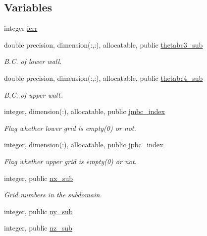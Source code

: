 \subsection*{Variables}
\begin{DoxyCompactItemize}
\item 
integer \hyperlink{namespacempi__subdomain_acd16f258caed20a7d8d38cd28ae64688}{ierr}
\item 
double precision, dimension(\+:,\+:), allocatable, public \hyperlink{namespacempi__subdomain_ad61f27caf5f32301a077e21363c2d73b}{thetabc3\+\_\+sub}
\begin{DoxyCompactList}\small\item\em B.\+C. of lower wall. \end{DoxyCompactList}\item 
double precision, dimension(\+:,\+:), allocatable, public \hyperlink{namespacempi__subdomain_ad1705bede0c0d39ad16f9f94afe32be6}{thetabc4\+\_\+sub}
\begin{DoxyCompactList}\small\item\em B.\+C. of upper wall. \end{DoxyCompactList}\item 
integer, dimension(\+:), allocatable, public \hyperlink{namespacempi__subdomain_ac22380b1c941dd6c53cabe7287d185e9}{jmbc\+\_\+index}
\begin{DoxyCompactList}\small\item\em Flag whether lower grid is empty(0) or not. \end{DoxyCompactList}\item 
integer, dimension(\+:), allocatable, public \hyperlink{namespacempi__subdomain_a9adbfdd11c7e9fdb968bb8eef2b13c2b}{jpbc\+\_\+index}
\begin{DoxyCompactList}\small\item\em Flag whether upper grid is empty(0) or not. \end{DoxyCompactList}\end{DoxyCompactItemize}
\textbf{ }\par
\begin{DoxyCompactItemize}
\item 
integer, public \hyperlink{namespacempi__subdomain_a005fe127fe0fc85b932814a820a36444}{nx\+\_\+sub}
\begin{DoxyCompactList}\small\item\em Grid numbers in the subdomain. \end{DoxyCompactList}\item 
integer, public \hyperlink{namespacempi__subdomain_a665ba05d0ae9309dd28b9b513a0c87a1}{ny\+\_\+sub}
\item 
integer, public \hyperlink{namespacempi__subdomain_a07555cc931ac78376a4c81207662251f}{nz\+\_\+sub}
\end{DoxyCompactItemize}

